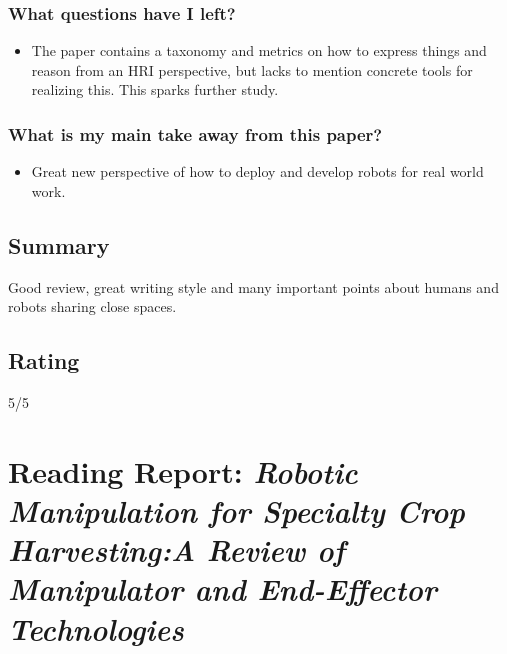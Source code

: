 \documentclass{article}
\begin{document}
\subsubsection*{What questions have I left?}
\begin{itemize}
    \item The paper contains a taxonomy and metrics on how to express things and reason from an HRI perspective, but lacks to mention concrete tools for realizing this. This sparks further study.
\end{itemize}
\subsubsection*{What is my main take away from this paper?}
\begin{itemize}
    \item Great new perspective of how to deploy and develop robots for real world work.
\end{itemize}

\subsection*{Summary}
Good review, great writing style and many important points about humans and robots sharing close spaces. 

\subsection*{Rating}
5/5


\section{Reading Report: \emph{Robotic Manipulation for Specialty Crop Harvesting:A Review of Manipulator and End-Effector Technologies}}
\cite{Davidson2020}
\end{document}
